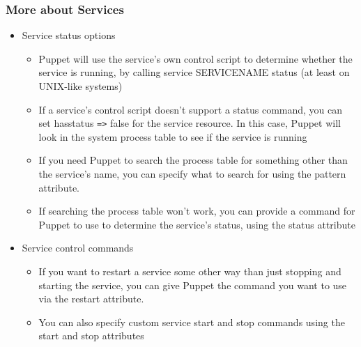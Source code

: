 \documentclass{beamer}
\begin{document}
\begin{frame}
\frametitle{More about Services}
\begin{itemize}
\item Service status options
\begin{itemize}
\item Puppet will use the service's own control script to determine whether the service is running,
by calling service SERVICENAME status (at least on UNIX-like systems)
\item If a service's control script doesn't support a status command, you can set hasstatus \texttt{=>}
false for the service resource. In this case, Puppet will look in the system process table to
see if the service is running
\item If you need Puppet to search the process table for something other than the service's name,
you can specify what to search for using the pattern attribute.
\item If searching the process table won't work, you can provide a command for Puppet to use to
determine the service's status, using the status attribute
\end{itemize}
\item Service control commands
\begin{itemize}
\item If you want to restart a service some other way than just stopping and starting the service,
you can give Puppet the command you want to use via the restart attribute.
\item You can also specify custom service start and stop commands using the start and
stop attributes
\end{itemize}
\end{itemize}

\end{frame}
\end{document}
